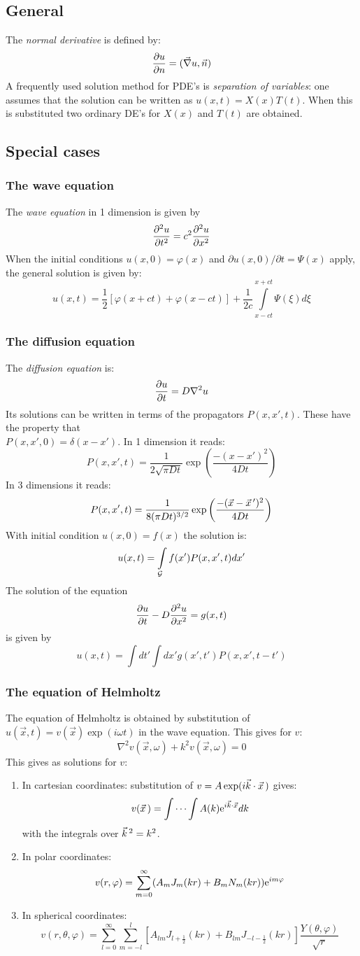 \documentclass[twoside]{report}
\begin{document}
\subsection{General}
The {\it normal derivative} is defined by:
\[
\frac{\partial u}{\partial n}=(\vec{\nabla}u,\vec{n})
\]
A frequently used solution method for PDE's is {\it separation of variables}:
one assumes that the solution can be written as $u(x,t)=X(x)T(t)$. When this
is substituted two ordinary DE's for $X(x)$ and $T(t)$ are obtained.

\subsection{Special cases}
\subsubsection{The wave equation}
The {\it wave equation} in 1 dimension is given by
\[
\frac{\partial^2 u}{\partial t^2}=c^2\frac{\partial^2 u}{\partial x^2}
\]
When the initial conditions $u(x,0)=\varphi(x)$ and
$\partial u(x,0)/\partial t=\Psi(x)$ apply, the general solution is given by:
\[
u(x,t)=\frac{1}{2}\left[\varphi(x+ct)+\varphi(x-ct)\right]+\frac{1}{2c}
\int\limits_{x-ct}^{x+ct}\Psi(\xi)d\xi
\]

\subsubsection{The diffusion equation}
The {\it diffusion equation} is:
\[
\frac{\partial u}{\partial t}=D\nabla^2u
\]
Its solutions can be written in terms of the propagators $P(x,x',t)$. These
have the property that\\ $P(x,x',0)=\delta(x-x')$. In 1 dimension it reads:
\[
P(x,x',t)=\frac{1}{2\sqrt{\pi Dt}}\exp\left(\frac{-(x-x')^2}{4Dt}\right)
\]
In 3 dimensions it reads:
\[
P(x,x',t)=\frac{1}{8(\pi Dt)^{3/2}}\exp\left(\frac{-(\vec{x}-\vec{x}\,')^2}{4Dt}\right)
\]
With initial condition $u(x,0)=f(x)$ the solution is:
\[
u(x,t)=\int\limits_{\cal G}f(x')P(x,x',t)dx'
\]
The solution of the equation
\[
\frac{\partial u}{\partial t}-D\frac{\partial^2 u}{\partial x^2}=g(x,t)
\]
is given by
\[
u(x,t)=\int dt' \int dx'g(x',t')P(x,x',t-t')
\]

\subsubsection{The equation of Helmholtz}
The equation of Helmholtz is obtained by substitution of
$u(\vec{x},t)=v(\vec{x})\exp(i\omega t)$ in the wave equation. This gives
for $v$:
\[
\nabla^2v(\vec{x},\omega)+k^2v(\vec{x},\omega)=0
\]
This gives as solutions for $v$:
\begin{enumerate}
\item In cartesian coordinates: substitution of
$v=A\exp(i\vec{k}\cdot\vec{x}\,)$ gives:
\[
v(\vec{x}\,)=\int\cdots\int A(k){\rm e}^{i\vec{k}\cdot\vec{x}}dk
\]
with the integrals over $\vec{k}\,^2=k^2$.
\item In polar coordinates:
\[
v(r,\varphi)=\sum_{m=0}^\infty(A_mJ_m(kr)+B_mN_m(kr)){\rm e}^{im\varphi}
\]
\item In spherical coordinates:
\[
v(r,\theta,\varphi)=\sum_{l=0}^\infty\sum_{m=-l}^l[A_{lm}J_{l+\frac{1}{2}}(kr)+B_{lm}J_{-l-\frac{1}{2}}(kr)]\frac{Y(\theta,\varphi)}{\sqrt{r}}
\]
\end{enumerate}
\end{document}
